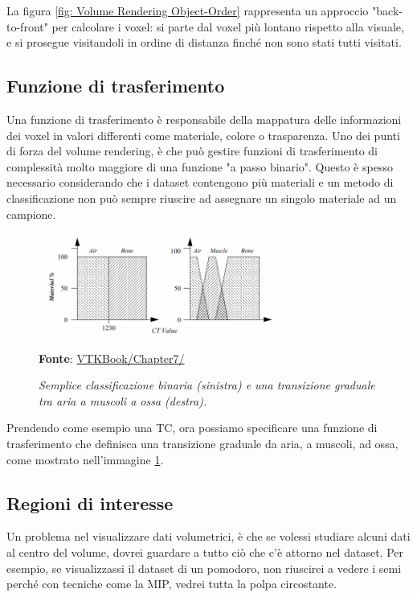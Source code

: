 La figura \ref{fig: Volume Rendering Object-Order} rappresenta un approccio "back-to-front" per calcolare i voxel: si parte dal voxel più lontano rispetto alla visuale, e si prosegue visitandoli in ordine di distanza finché non sono stati tutti visitati.

\subsection{Funzione di trasferimento}\label{sec:funzione-trasferimento}
Una funzione di trasferimento è responsabile della mappatura delle informazioni dei voxel in valori differenti come materiale, colore o trasparenza. Uno dei punti di forza del volume rendering, è che può gestire funzioni di trasferimento di complessità molto maggiore di una funzione "a passo binario". Questo è spesso necessario considerando che i dataset contengono più materiali e un metodo di classificazione non può sempre riuscire ad assegnare un singolo materiale ad un campione.

\begin{figure}[h]
    \centering
    \includegraphics[width=0.7\textwidth]{immagini/volumerendering/functions.png}
    \caption{\textit{Semplice classificazione binaria (sinistra) e una transizione graduale tra aria a muscoli a ossa (destra).}}
    \textbf{Fonte}: \href{https://lorensen.github.io/VTKExamples/site/VTKBook/07Chapter7/}{VTKBook/Chapter7/}
    \label{fig: Funzione di Trasferimento}
\end{figure}

Prendendo come esempio una TC, ora possiamo specificare una funzione di trasferimento che definisca una transizione graduale da aria, a muscoli, ad ossa, come mostrato nell'immagine \ref{fig: Funzione di Trasferimento}.

\subsection{Regioni di interesse}\label{sec:regioni-di-interesse}
Un problema nel visualizzare dati volumetrici, è che se volessi studiare alcuni dati al centro del volume, dovrei guardare a tutto ciò che c'è attorno nel dataset. Per esempio, se visualizzassi il dataset di un pomodoro, non riuscirei a vedere i semi perché con tecniche come la MIP, vedrei tutta la polpa circostante.

